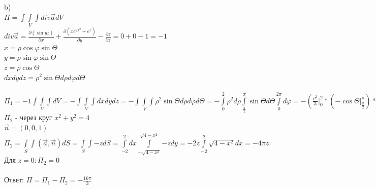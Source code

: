 \documentclass{article}
\begin{document}
        \newpage
        \begin{figure}[h!]
        \end{figure}\\\\
        b)\\
        $\Pi = \int\limits{\int\limits_V{\int\limits{div\vec{a}dV}}}$\\
        $div\vec{a} = \frac{\partial(\sin{yz})}{\partial x} + \frac{\partial(xe^{2x^2} + e^z)}{\partial y} - \frac{\partial z}{\partial z} = 0 + 0 - 1 = -1$\\
        $x = \rho\cos{\varphi}\sin{\Theta}$\\
        $y = \rho\sin{\varphi}\sin{\Theta}$\\
        $z = \rho\cos{\Theta}$\\
        $dxdydz = \rho^2\sin{\Theta}d\rho d\varphi d\Theta$\\\\
        $\Pi_1 = -1 \int\limits{\int\limits_V{\int\limits{dV}}} = -\int\limits{\int\limits_V{\int\limits{dxdydz}}} = -\int\limits{\int\limits_V{\int\limits{\rho^2\sin{\Theta}d\rho d\varphi d\Theta}}} = -\int\limits^2_0{\rho^2d\rho \int\limits^{\pi}_{\frac{\pi}{2}}\sin{\Theta}d\Theta \int\limits^{2\pi}_{0}d\varphi} = -(\frac{\rho^3}{3} |^2_0 *(-\cos{\Theta} |^{\pi}_{\frac{\pi}{2}}) * (\varphi |^{2\pi}_0)) = - (\frac{8}{3}*(-(-1 - 0)*(2\pi - 0))) = -\frac{16\pi}{3}$\\
        $\Pi_2$ - через круг $x^2 + y^2 = 4$\\
        $\vec{n} = (0, 0, 1)$\\
        $\Pi_2 = \int\limits_S{\int\limits{(\vec{a}, \vec{n})dS}} = \int\limits_S{\int\limits{-zdS}} = \int\limits^2_{-2}{dx \int\limits^{\sqrt{4 - x^2}}_{-\sqrt{4 - x^2}}{-zdy}} = -2z\int\limits^2_{-2}{\sqrt{4 - x^2}dx} = -4\pi z$\\
        Для $z = 0: \Pi_2 = 0$\\\\
        Ответ: $\Pi = \Pi_1 - \Pi_2 = -\frac{16\pi}{3}$
\end{document}
